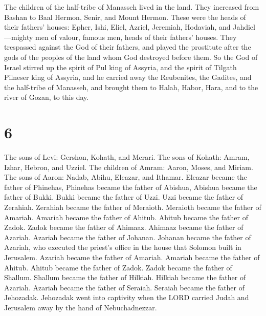  The children of the half-tribe of Manasseh lived in the
land. They increased from Bashan to Baal Hermon, Senir, and Mount
Hermon.  These were the heads of their fathers' houses:
Epher, Ishi, Eliel, Azriel, Jeremiah, Hodaviah, and Jahdiel---mighty men
of valour, famous men, heads of their fathers' houses. 
They trespassed against the God of their fathers, and played the
prostitute after the gods of the peoples of the land whom God destroyed
before them.  So the God of Israel stirred up the spirit of
Pul king of Assyria, and the spirit of Tilgath Pilneser king of Assyria,
and he carried away the Reubenites, the Gadites, and the half-tribe of
Manasseh, and brought them to Halah, Habor, Hara, and to the river of
Gozan, to this day.

\hypertarget{section-5}{%
\section{6}\label{section-5}}

 The sons of Levi: Gershon, Kohath, and Merari. 
The sons of Kohath: Amram, Izhar, Hebron, and Uzziel.  The
children of Amram: Aaron, Moses, and Miriam. The sons of Aaron: Nadab,
Abihu, Eleazar, and Ithamar.  Eleazar became the father of
Phinehas, Phinehas became the father of Abishua,  Abishua
became the father of Bukki. Bukki became the father of Uzzi.
 Uzzi became the father of Zerahiah. Zerahiah became the
father of Meraioth.  Meraioth became the father of Amariah.
Amariah became the father of Ahitub.  Ahitub became the
father of Zadok. Zadok became the father of Ahimaaz. 
Ahimaaz became the father of Azariah. Azariah became the father of
Johanan.  Johanan became the father of Azariah, who
executed the priest's office in the house that Solomon built in
Jerusalem.  Azariah became the father of Amariah. Amariah
became the father of Ahitub.  Ahitub became the father of
Zadok. Zadok became the father of Shallum.  Shallum became
the father of Hilkiah. Hilkiah became the father of Azariah.
 Azariah became the father of Seraiah. Seraiah became the
father of Jehozadak.  Jehozadak went into captivity when
the LORD carried Judah and Jerusalem away by the hand of Nebuchadnezzar.

